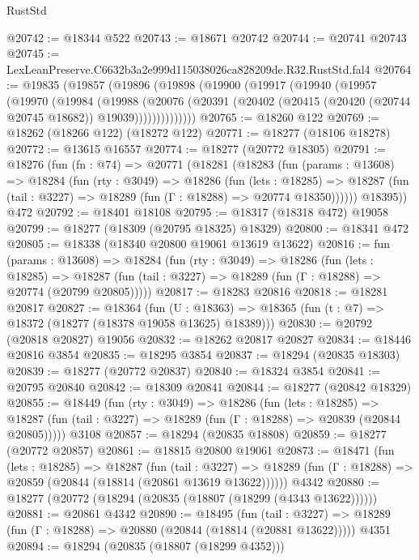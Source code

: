 \begin{lexlean}{RustStd}
\begin{coremodule}
@20742 := @18344 @522
@20743 := @18671 @20742
@20744 := @20741 @20743
@20745 := LexLeanPreserve.C6632b3a2e999d115038026ca828209de.R32.RustStd.fal4
@20764 := @19835
    (@19857
      (@19896
        (@19898
          (@19900
            (@19917
              (@19940
                (@19957
                  (@19970
                    (@19984
                      (@19988
                        (@20076
                          (@20391
                            (@20402 (@20415 (@20420 (@20744 @20745 @18682)) @19039))))))))))))))
@20765 := @18260 @122
@20769 := @18262 (@18266 @122) (@18272 @122)
@20771 := @18277 (@18106 @18278)
@20772 := @13615 @16557
@20774 := @18277 (@20772 @18305)
@20791 := @18276
    (fun (fn : @74) =>
    @20771
      (@18281
        (@18283
          (fun (params : @13608) =>
          @18284
            (fun (rty : @3049) =>
            @18286
              (fun (lets : @18285) =>
              @18287 (fun (tail : @3227) => @18289 (fun (Γ : @18288) => @20774 @18350))))))
        @18395))
    @472
@20792 := @18401 @18108
@20795 := @18317 (@18318 @472) @19058
@20799 := @18277 (@18309 (@20795 @18325) @18329)
@20800 := @18341 @472
@20805 := @18338 (@18340 @20800 @19061 @13619 @13622)
@20816 := fun (params : @13608) =>
  @18284
    (fun (rty : @3049) =>
    @18286
      (fun (lets : @18285) =>
      @18287 (fun (tail : @3227) => @18289 (fun (Γ : @18288) => @20774 (@20799 @20805)))))
@20817 := @18283 @20816
@20818 := @18281 @20817
@20827 := @18364
    (fun (U : @18363) => @18365 (fun (t : @7) => @18372 (@18277 (@18378 @19058 @13625) @18389)))
@20830 := @20792 (@20818 @20827) @19056
@20832 := @18262 @20817 @20827
@20834 := @18446 @20816 @3854
@20835 := @18295 @3854
@20837 := @18294 (@20835 @18303)
@20839 := @18277 (@20772 @20837)
@20840 := @18324 @3854
@20841 := @20795 @20840
@20842 := @18309 @20841
@20844 := @18277 (@20842 @18329)
@20855 := @18449
    (fun (rty : @3049) =>
    @18286
      (fun (lets : @18285) =>
      @18287 (fun (tail : @3227) => @18289 (fun (Γ : @18288) => @20839 (@20844 @20805)))))
    @3108
@20857 := @18294 (@20835 @18808)
@20859 := @18277 (@20772 @20857)
@20861 := @18815 @20800 @19061
@20873 := @18471
    (fun (lets : @18285) =>
    @18287
      (fun (tail : @3227) =>
      @18289 (fun (Γ : @18288) => @20859 (@20844 (@18814 (@20861 @13619 @13622))))))
    @4342
@20880 := @18277 (@20772 (@18294 (@20835 (@18807 (@18299 (@4343 @13622))))))
@20881 := @20861 @4342
@20890 := @18495
    (fun (tail : @3227) => @18289 (fun (Γ : @18288) => @20880 (@20844 (@18814 (@20881 @13622)))))
    @4351
@20894 := @18294 (@20835 (@18807 (@18299 @4352)))

\end{coremodule}
\end{lexlean}
